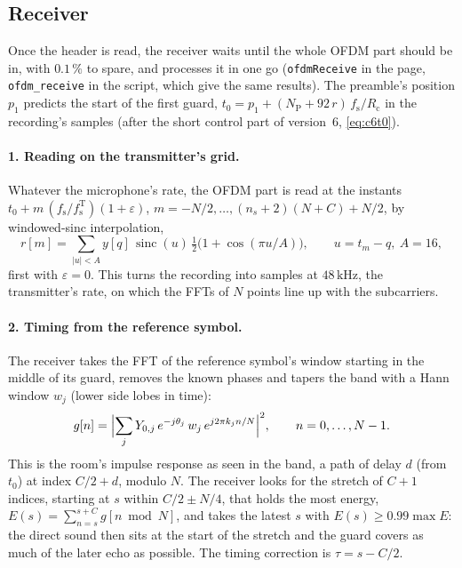 \documentclass[11pt,a4paper]{article}
\newcommand{\kHz}{\,\mathrm{kHz}}
\newcommand{\code}[1]{\texttt{#1}}
\newcommand{\fsT}{f_{\mathrm{s}}^{\mathrm{T}}}
\newcommand{\fs}{f_{\mathrm{s}}}
\newcommand{\Rc}{R_{\mathrm{c}}}
\newcommand{\NP}{N_{\mathrm{P}}}
\theoremstyle{remark}
\begin{document}
\subsection{Receiver}
\label{sec:ofdmrx}
Once the header is read, the receiver waits until the whole OFDM part should be in, with $0.1\,\%$ to spare, and processes it in one go (\code{ofdmReceive} in the page, \code{ofdm\_receive} in the script, which give the same results). The preamble's position $p_1$ predicts the start of the first guard, $t_0 = p_1 + (\NP + 92\,r)\,\fs/\Rc$ in the recording's samples (after the short control part of version~6, \cref{eq:c6t0}).

\paragraph{1. Reading on the transmitter's grid.}
Whatever the microphone's rate, the OFDM part is read at the instants $t_0 + m\,(\fs/\fsT)(1 + \varepsilon)$, $m = -N/2, \dots, (n_s + 2)(N + C) + N/2$, by windowed-sinc interpolation,
\begin{equation}
r[m] = \sum_{|u| < A} y[q]\,\operatorname{sinc}(u)\,\tfrac12\bigl(1 + \cos(\pi u/A)\bigr), \qquad u = t_m - q,\ A = 16,
\end{equation}
first with $\varepsilon = 0$. This turns the recording into samples at $48\kHz$, the transmitter's rate, on which the FFTs of $N$ points line up with the subcarriers.

\paragraph{2. Timing from the reference symbol.}
The receiver takes the FFT of the reference symbol's window starting in the middle of its guard, removes the known phases and tapers the band with a Hann window $w_j$ (lower side lobes in time):
\begin{equation}
g[n] = \Bigl|\sum_{j} Y_{0,j}\, e^{-j\theta_j}\, w_j\, e^{j 2\pi k_j n/N}\Bigr|^2, \qquad n = 0, \dots, N - 1.
\end{equation}
This is the room's impulse response as seen in the band, a path of delay $d$ (from $t_0$) at index $C/2 + d$, modulo $N$. The receiver looks for the stretch of $C + 1$ indices, starting at $s$ within $C/2 \pm N/4$, that holds the most energy, $E(s) = \sum_{n=s}^{s+C} g[n \bmod N]$, and takes the latest $s$ with $E(s) \ge 0.99 \max E$: the direct sound then sits at the start of the stretch and the guard covers as much of the later echo as possible. The timing correction is $\tau = s - C/2$.
\end{document}
